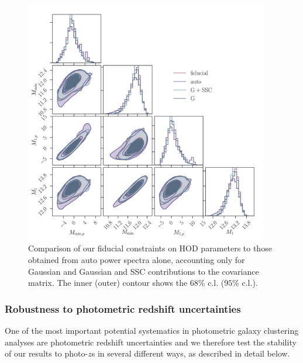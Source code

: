 \documentclass[a4paper,11pt]{article}
\begin{document}
\begin{figure}
\begin{center}
\includegraphics[width=0.95\textwidth]{figures/contours-Mmin-M1_mPk=HOD_fix=alpha-fc-sigmaM_HOD=zevol_fit=pz-shifts-pz-widths+prior=0p2_fit=auto+cross_cosmo=const_HOD-param=zfid_clfit=HOD-zevol_cov=G+NG+SSC-vs-fit=auto-vs-cov=G-vs-cov=G+SSC.pdf}
\caption{Comparison of our fiducial constraints on HOD parameters to those obtained from auto power spectra alone, accounting only for Gaussian and Gaussian and SSC contributions to the covariance matrix. The inner (outer) contour shows the $68 \%$ c.l. ($95 \%$ c.l.).}
\label{fig:constraints-cov=G+NG+SSC-vs-cov=G-vs-cov=G+SSC-vs-fit=auto}
\end{center}
\end{figure}

\subsubsection{Robustness to photometric redshift uncertainties}

One of the most important potential systematics in photometric galaxy clustering analyses are photometric redshift uncertainties and we therefore test the stability of our results to photo-$z$s in several different ways, as described in detail below. 
\end{document}
